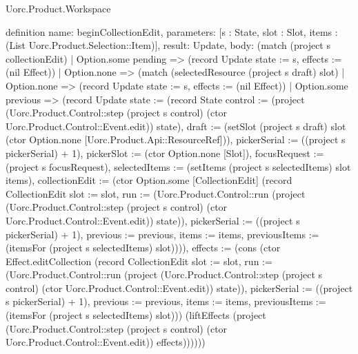 \begin{lexlean}{Uorc.Product.Workspace}
\begin{semanticmodule}
definition{
  name: beginCollectionEdit,
  parameters: [s : State, slot : Slot, items : (List Uorc.Product.Selection::Item)],
  result: Update,
  body: (match (project s collectionEdit)
    | Option.some pending => (record Update {state := s, effects := (nil Effect)})
    | Option.none => (match (selectedResource (project s draft) slot)
      | Option.none => (record Update {state := s, effects := (nil Effect)})
      | Option.some previous => (record Update {state := (record State {control := (project (Uorc.Product.Control::step (project s control) (ctor Uorc.Product.Control::Event.edit)) state), draft := (setSlot (project s draft) slot (ctor Option.none [Uorc.Product.Api::ResourceRef])), pickerSerial := ((project s pickerSerial) + 1), pickerSlot := (ctor Option.none [Slot]), focusRequest := (project s focusRequest), selectedItems := (setItems (project s selectedItems) slot items), collectionEdit := (ctor Option.some [CollectionEdit] (record CollectionEdit {slot := slot, run := (Uorc.Product.Control::run (project (Uorc.Product.Control::step (project s control) (ctor Uorc.Product.Control::Event.edit)) state)), pickerSerial := ((project s pickerSerial) + 1), previous := previous, items := items, previousItems := (itemsFor (project s selectedItems) slot)}))}), effects := (cons (ctor Effect.editCollection (record CollectionEdit {slot := slot, run := (Uorc.Product.Control::run (project (Uorc.Product.Control::step (project s control) (ctor Uorc.Product.Control::Event.edit)) state)), pickerSerial := ((project s pickerSerial) + 1), previous := previous, items := items, previousItems := (itemsFor (project s selectedItems) slot)})) (liftEffects (project (Uorc.Product.Control::step (project s control) (ctor Uorc.Product.Control::Event.edit)) effects)))})))
}


\end{semanticmodule}
\end{lexlean}
